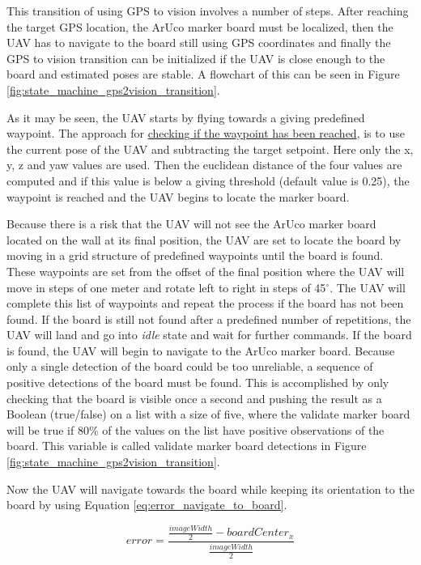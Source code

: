 \documentclass[../Head/report.tex]{subfiles}
\begin{document}
This transition of using GPS to vision involves a number of steps. After reaching the target GPS location, the ArUco marker board must be localized, then the UAV has to navigate to the board still using GPS coordinates and finally the GPS to vision transition can be initialized if the UAV is close enough to the board and estimated poses are stable. A flowchart of this can be seen in Figure \ref{fig:state_machine_gps2vision_transition}. 

As it may be seen, the UAV starts by flying towards a giving predefined waypoint. The approach for \href{https://github.com/Kenil16/master_project/blob/master/software/ros_workspace/src/offboard_control/waypoint_checking.py}{checking if the waypoint has been reached}, is to use the current pose of the UAV and subtracting the target setpoint. Here only the x, y, z and yaw values are used. Then the euclidean distance of the four values are computed and if this value is below a giving threshold (default value is 0.25), the waypoint is reached and the UAV begins to locate the marker board. 

Because there is a risk that the UAV will not see the ArUco marker board located on the wall at its final position, the UAV are set to locate the board by moving in a grid structure of predefined waypoints until the board is found. These waypoints are set from the offset of the final position where the UAV will move in steps of one meter and rotate left to right in steps of 45$^{\circ}$. The UAV will complete this list of waypoints and repeat the process if the board has not been found. If the board is still not found after a predefined number of repetitions, the UAV will land and go into \textit{idle} state and wait for further commands. If the board 
is found, the UAV will begin to navigate to the ArUco marker board. Because only a single detection of the board could be too unreliable, a sequence of positive detections of the board must be found. This is accomplished by only checking that the board is visible once a second and pushing the result as a Boolean (true/false) on a list with a size of five, where the validate marker board will be true if 80\% of the values on the list have positive observations of the board. This variable is called validate marker board detections in Figure \ref{fig:state_machine_gps2vision_transition}.

Now the UAV will navigate towards the board while keeping its orientation to the board by using Equation \ref{eq:error_navigate_to_board}. 

\begin{equation}
	error = \frac{\frac{imageWidth}{2} - boardCenter_x}{\frac{imageWidth}{2}}
\label{eq:error_navigate_to_board}
\end{equation}    
\end{document}
